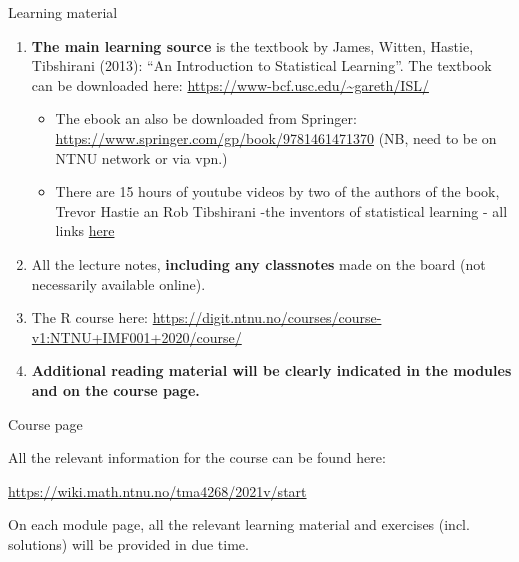 \documentclass[10pt,ignorenonframetext,]{beamer}
\begin{document}
\begin{frame}{Learning material}
\protect\hypertarget{learning-material}{}

\begin{enumerate}
[1)]
\item
  \textbf{The main learning source} is the textbook by James, Witten,
  Hastie, Tibshirani (2013): ``An Introduction to Statistical
  Learning''. The textbook can be downloaded here:
  \url{https://www-bcf.usc.edu/~gareth/ISL/}

  \begin{itemize}
  \item
    The ebook an also be downloaded from Springer:
    \url{https://www.springer.com/gp/book/9781461471370} (NB, need to be
    on NTNU network or via vpn.)
  \item
    There are 15 hours of youtube videos by two of the authors of the
    book, Trevor Hastie an Rob Tibshirani -the inventors of statistical
    learning - all links
    \href{https://www.r-bloggers.com/in-depth-introduction-to-machine-learning-in-15-hours-of-expert-videos/}{here}
  \end{itemize}
\item
  All the lecture notes, \textbf{including any classnotes} made on the
  board (not necessarily available online).
\item
  The R course here:
  \url{https://digit.ntnu.no/courses/course-v1:NTNU+IMF001+2020/course/}
\item
  \textbf{Additional reading material will be clearly indicated in the
  modules and on the course page.}
\end{enumerate}

\end{frame}

\begin{frame}{Course page}
\protect\hypertarget{course-page}{}

All the relevant information for the course can be found here:

\url{https://wiki.math.ntnu.no/tma4268/2021v/start}

On each module page, all the relevant learning material and exercises
(incl. solutions) will be provided in due time.

\end{frame}
\end{document}

